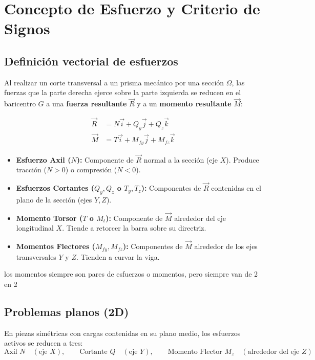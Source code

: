 \section{Concepto de Esfuerzo y Criterio de Signos}

\subsection{Definición vectorial de esfuerzos}
Al realizar un corte transversal a un prisma mecánico por una sección $\Omega$, las fuerzas que la parte derecha ejerce sobre la parte izquierda se reducen en el baricentro $G$ a una \textbf{fuerza resultante} $\vec{R}$ y a un \textbf{momento resultante} $\vec{M}$:

\begin{align}
    \vec{R} & = N\vec{i} + Q_y\vec{j} + Q_z\vec{k}       \\
    \vec{M} & = T\vec{i} + M_{fy}\vec{j} + M_{fz}\vec{k}
\end{align}

\begin{itemize}
    \item \textbf{Esfuerzo Axil ($N$):} Componente de $\vec{R}$ normal a la sección (eje $X$). Produce tracción ($N > 0$) o compresión ($N < 0$).
    \item \textbf{Esfuerzos Cortantes ($Q_y, Q_z$ o $T_y, T_z$):} Componentes de $\vec{R}$ contenidas en el plano de la sección (ejes $Y, Z$).
    \item \textbf{Momento Torsor ($T$ o $M_t$):} Componente de $\vec{M}$ alrededor del eje longitudinal $X$. Tiende a retorcer la barra sobre su directriz.
    \item \textbf{Momentos Flectores ($M_{fy}, M_{fz}$):} Componentes de $\vec{M}$ alrededor de los ejes transversales $Y$ y $Z$. Tienden a curvar la viga.
\end{itemize}
los momentos siempre son pares de esfuerzos o momentos, pero siempre van de 2 en 2
\subsection{Problemas planos (2D)}
En piezas simétricas con cargas contenidas en su plano medio, los esfuerzos activos se reducen a tres:
\begin{equation}
    \text{Axil } N \quad (\text{eje } X), \qquad \text{Cortante } Q \quad (\text{eje } Y), \qquad \text{Momento Flector } M_z \quad (\text{alrededor del eje } Z)
\end{equation}

